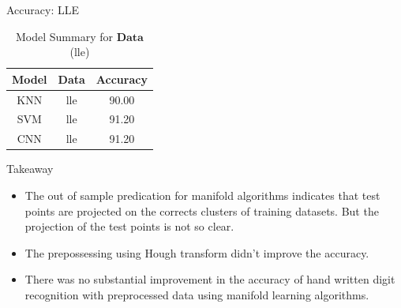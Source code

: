 \documentclass{beamer}
\theoremstyle{plain}
\theoremstyle{definition}
\theoremstyle{plain}
\theoremstyle{plain}
\begin{document}
\begin{frame}{Accuracy: LLE}

\begin{table}[ht]
\caption{Model Summary for $\mathbf{Data}$(lle)}
\centering
\begin{tabular}{c c c }
\hline\hline
Model & Data & Accuracy\\ [0.5ex]
\hline
KNN & lle & 90.00 \\
SVM & lle & 91.20 \\
CNN & lle & 91.20\\ [1ex]
\hline
\end{tabular}
\label{R:LLE}
\end{table}

\end{frame}
\begin{frame}{Takeaway}
\begin{itemize}
\item The out of sample predication for manifold algorithms indicates that test points are projected on the corrects clusters of training datasets. But the projection of the test points is not so clear.
\item The prepossessing using Hough transform didn't improve the accuracy.
\item There was no substantial improvement in the accuracy of hand written digit recognition with preprocessed data using manifold learning algorithms.
\end{itemize}

\end{frame}
\end{document}
